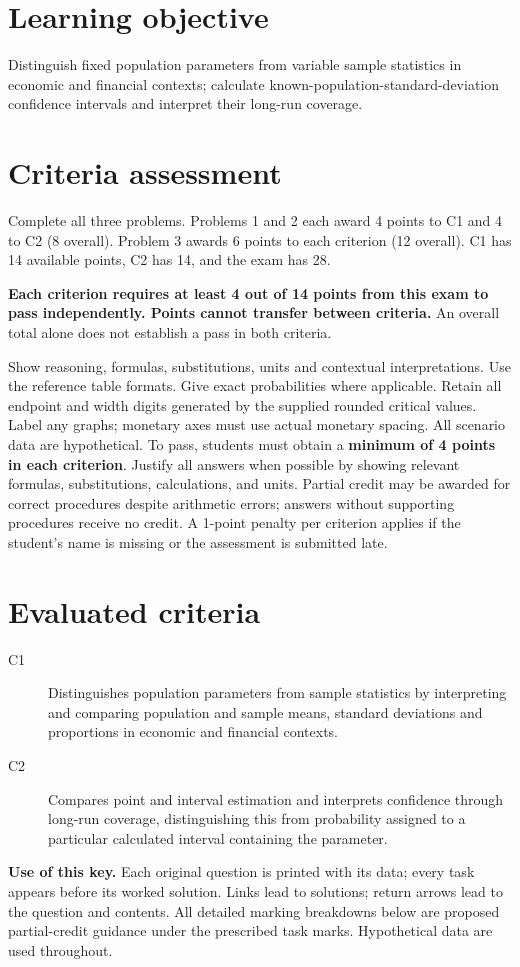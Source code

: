 \maketitle
\setcounter{tocdepth}{1}
\label{toc}\tableofcontents
\begingroup\small
\section*{Learning objective}
Distinguish fixed population parameters from variable sample statistics in economic and financial contexts; calculate known-population-standard-deviation confidence intervals and interpret their long-run coverage.
\section*{Criteria assessment}
Complete all three problems. Problems 1 and 2 each award 4 points to C1 and 4 to C2 (8 overall). Problem 3 awards 6 points to each criterion (12 overall). C1 has 14 available points, C2 has 14, and the exam has 28.

\textbf{Each criterion requires at least 4 out of 14 points from this exam to pass independently. Points cannot transfer between criteria.} An overall total alone does not establish a pass in both criteria.

Show reasoning, formulas, substitutions, units and contextual interpretations. Use the reference table formats. Give exact probabilities where applicable. Retain all endpoint and width digits generated by the supplied rounded critical values. Label any graphs; monetary axes must use actual monetary spacing. All scenario data are hypothetical.
To pass, students must obtain a \textbf{minimum of 4 points in each criterion}. Justify all answers when possible by showing relevant formulas, substitutions, calculations, and units. Partial credit may be awarded for correct procedures despite arithmetic errors; answers without supporting procedures receive no credit. A 1-point penalty per criterion applies if the student's name is missing or the assessment is submitted late.

\section*{Evaluated criteria}
\begin{description}
\item[C1] Distinguishes population parameters from sample statistics by interpreting and comparing population and sample means, standard deviations and proportions in economic and financial contexts.
\item[C2] Compares point and interval estimation and interprets confidence through long-run coverage, distinguishing this from probability assigned to a particular calculated interval containing the parameter.
\end{description}
\endgroup
\clearpage
\textbf{Use of this key.} Each original question is printed with its data; every task appears before its worked solution. Links lead to solutions; return arrows lead to the question and contents. All detailed marking breakdowns below are proposed partial-credit guidance under the prescribed task marks. Hypothetical data are used throughout.

